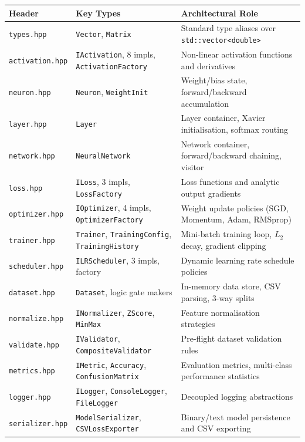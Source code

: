 \documentclass[11pt,a4paper]{article}
\begin{document}
\begin{table}[htbp]
\small
\centering
\begin{tabularx}{\textwidth}{llX}
\toprule
\textbf{Header} & \textbf{Key Types} & \textbf{Architectural Role} \\
\midrule
\texttt{types.hpp} & \texttt{Vector}, \texttt{Matrix} & Standard type aliases over \texttt{std::vector<double>} \\
\texttt{activation.hpp} & \texttt{IActivation}, 8 impls, \texttt{ActivationFactory} & Non-linear activation functions and derivatives \\
\texttt{neuron.hpp} & \texttt{Neuron}, \texttt{WeightInit} & Weight/bias state, forward/backward accumulation \\
\texttt{layer.hpp} & \texttt{Layer} & Layer container, Xavier initialisation, softmax routing \\
\texttt{network.hpp} & \texttt{NeuralNetwork} & Network container, forward/backward chaining, visitor \\
\texttt{loss.hpp} & \texttt{ILoss}, 3 impls, \texttt{LossFactory} & Loss functions and analytic output gradients \\
\texttt{optimizer.hpp} & \texttt{IOptimizer}, 4 impls, \texttt{OptimizerFactory} & Weight update policies (SGD, Momentum, Adam, RMSprop) \\
\texttt{trainer.hpp} & \texttt{Trainer}, \texttt{TrainingConfig}, \texttt{TrainingHistory} & Mini-batch training loop, $L_2$ decay, gradient clipping \\
\texttt{scheduler.hpp} & \texttt{ILRScheduler}, 3 impls, factory & Dynamic learning rate schedule policies \\
\texttt{dataset.hpp} & \texttt{Dataset}, logic gate makers & In-memory data store, CSV parsing, 3-way splits \\
\texttt{normalize.hpp} & \texttt{INormalizer}, \texttt{ZScore}, \texttt{MinMax} & Feature normalisation strategies \\
\texttt{validate.hpp} & \texttt{IValidator}, \texttt{CompositeValidator} & Pre-flight dataset validation rules \\
\texttt{metrics.hpp} & \texttt{IMetric}, \texttt{Accuracy}, \texttt{ConfusionMatrix} & Evaluation metrics, multi-class performance statistics \\
\texttt{logger.hpp} & \texttt{ILogger}, \texttt{ConsoleLogger}, \texttt{FileLogger} & Decoupled logging abstractions \\
\texttt{serializer.hpp} & \texttt{ModelSerializer}, \texttt{CSVLossExporter} & Binary/text model persistence and CSV exporting \\

\end{tabularx}
\end{table}
\end{document}
